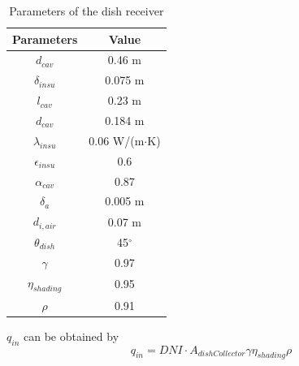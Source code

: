 \documentclass{article}
\begin{document}
\begin{table}[htbp]
	\caption{Parameters of the dish receiver}
	\begin{center}
	\begin{tabular}{cc}
		\toprule
		Parameters	&	Value\\
		\midrule
		$d_{cav}$	&	0.46 m\\
		$\delta_{insu}$	&	0.075 m\\
		$l_{cav}$	&	0.23 m\\
		$d_{cav}$	&	0.184 m\\
		$\lambda_{insu}$	&	0.06 W/(m$\cdot$K)\\
		$\epsilon_{insu}$	&	0.6\\
		$\alpha_{cav}$	&	0.87\\
		$\delta_a$	&	0.005 m\\
		$d_{i,air}$	&	0.07 m\\
		$\theta_{dish}$	&	45$^\circ$\\
		$\gamma$	&	0.97\\
		$\eta_{shading}$	&	0.95\\
		$\rho$	&	0.91\\
		\bottomrule
	\end{tabular}
	\end{center}
	\label{tab:dishReceiver}
\end{table}
$q_{in}$ can be obtained by
\begin{equation}
q_{in}=DNI\cdot A_{dishCollector}\gamma\eta_{shading}\rho\label{eq:q_in}
\end{equation}



\clearpage


\end{document}
